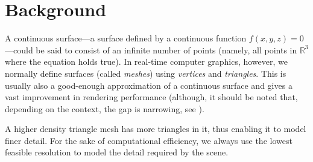 \chapter{Background}

A continuous surface---a surface defined by a continuous function $f(x,y,z)=0$---could be said to
consist of an infinite number of points (namely, all points in $\mathbb{R}^3$ where the equation
holds true).  In real-time computer graphics, however, we normally define surfaces (called
\textit{meshes}) using \textit{vertices} and \textit{triangles}.  This is usually also a good-enough
approximation of a continuous surface and gives a vast improvement in rendering performance
(although, it should be noted that, depending on the context, the gap is narrowing, see
\citet{chang2015}).


A higher density triangle mesh has more triangles in it, thus enabling it to model finer detail.
For the sake of computational efficiency, we always use the lowest feasible resolution to model the
detail required by the scene.
